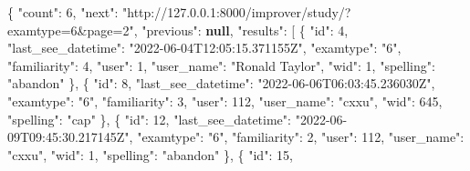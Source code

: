 \documentclass[
]{article}
\newenvironment{Shaded}{}{}
\newcommand{\DataTypeTok}[1]{\textcolor[rgb]{0.56,0.13,0.00}{#1}}
\newcommand{\DecValTok}[1]{\textcolor[rgb]{0.25,0.63,0.44}{#1}}
\newcommand{\FunctionTok}[1]{\textcolor[rgb]{0.02,0.16,0.49}{#1}}
\newcommand{\KeywordTok}[1]{\textcolor[rgb]{0.00,0.44,0.13}{\textbf{#1}}}
\newcommand{\OtherTok}[1]{\textcolor[rgb]{0.00,0.44,0.13}{#1}}
\newcommand{\StringTok}[1]{\textcolor[rgb]{0.25,0.44,0.63}{#1}}
\begin{document}
\begin{Shaded}
\begin{Highlighting}[]
\FunctionTok{\{}
  \DataTypeTok{"count"}\FunctionTok{:} \DecValTok{6}\FunctionTok{,}
  \DataTypeTok{"next"}\FunctionTok{:} \StringTok{"http://127.0.0.1:8000/improver/study/?examtype=6\&page=2"}\FunctionTok{,}
  \DataTypeTok{"previous"}\FunctionTok{:} \KeywordTok{null}\FunctionTok{,}
  \DataTypeTok{"results"}\FunctionTok{:} \OtherTok{[}
    \FunctionTok{\{}
      \DataTypeTok{"id"}\FunctionTok{:} \DecValTok{4}\FunctionTok{,}
      \DataTypeTok{"last\_see\_datetime"}\FunctionTok{:} \StringTok{"2022{-}06{-}04T12:05:15.371155Z"}\FunctionTok{,}
      \DataTypeTok{"examtype"}\FunctionTok{:} \StringTok{"6"}\FunctionTok{,}
      \DataTypeTok{"familiarity"}\FunctionTok{:} \DecValTok{4}\FunctionTok{,}
      \DataTypeTok{"user"}\FunctionTok{:} \DecValTok{1}\FunctionTok{,}
      \DataTypeTok{"user\_name"}\FunctionTok{:} \StringTok{"Ronald Taylor"}\FunctionTok{,}
      \DataTypeTok{"wid"}\FunctionTok{:} \DecValTok{1}\FunctionTok{,}
      \DataTypeTok{"spelling"}\FunctionTok{:} \StringTok{"abandon"}
    \FunctionTok{\}}\OtherTok{,}
    \FunctionTok{\{}
      \DataTypeTok{"id"}\FunctionTok{:} \DecValTok{8}\FunctionTok{,}
      \DataTypeTok{"last\_see\_datetime"}\FunctionTok{:} \StringTok{"2022{-}06{-}06T06:03:45.236030Z"}\FunctionTok{,}
      \DataTypeTok{"examtype"}\FunctionTok{:} \StringTok{"6"}\FunctionTok{,}
      \DataTypeTok{"familiarity"}\FunctionTok{:} \DecValTok{3}\FunctionTok{,}
      \DataTypeTok{"user"}\FunctionTok{:} \DecValTok{112}\FunctionTok{,}
      \DataTypeTok{"user\_name"}\FunctionTok{:} \StringTok{"cxxu"}\FunctionTok{,}
      \DataTypeTok{"wid"}\FunctionTok{:} \DecValTok{645}\FunctionTok{,}
      \DataTypeTok{"spelling"}\FunctionTok{:} \StringTok{"cap"}
    \FunctionTok{\}}\OtherTok{,}
    \FunctionTok{\{}
      \DataTypeTok{"id"}\FunctionTok{:} \DecValTok{12}\FunctionTok{,}
      \DataTypeTok{"last\_see\_datetime"}\FunctionTok{:} \StringTok{"2022{-}06{-}09T09:45:30.217145Z"}\FunctionTok{,}
      \DataTypeTok{"examtype"}\FunctionTok{:} \StringTok{"6"}\FunctionTok{,}
      \DataTypeTok{"familiarity"}\FunctionTok{:} \DecValTok{2}\FunctionTok{,}
      \DataTypeTok{"user"}\FunctionTok{:} \DecValTok{112}\FunctionTok{,}
      \DataTypeTok{"user\_name"}\FunctionTok{:} \StringTok{"cxxu"}\FunctionTok{,}
      \DataTypeTok{"wid"}\FunctionTok{:} \DecValTok{1}\FunctionTok{,}
      \DataTypeTok{"spelling"}\FunctionTok{:} \StringTok{"abandon"}
    \FunctionTok{\}}\OtherTok{,}
    \FunctionTok{\{}
      \DataTypeTok{"id"}\FunctionTok{:} \DecValTok{15}\FunctionTok{,}

\end{Highlighting}
\end{Shaded}
\end{document}
